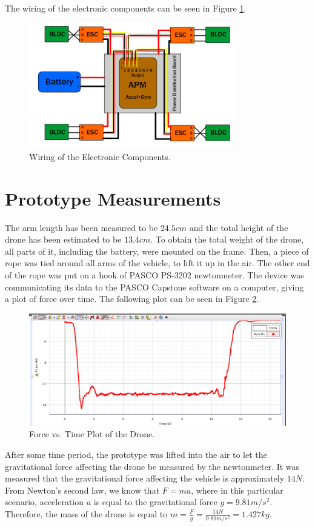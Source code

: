 The wiring of the electronic components can be seen in Figure \ref{wiring}.
\begin{figure}[H]
  \centering
    \includegraphics[width=0.8\textwidth]{images/Wiring2.png}
	\caption{Wiring of the Electronic Components.}
	\label{wiring}
\end{figure}

\section{Prototype Measurements}
The arm length has been measured to be $24.5 cm$ and the total height of the drone has been estimated to be $13.4 cm$.
To obtain the total weight of the drone, all parts of it, including the battery, were mounted on the frame. Then, a piece of rope was tied around all arms of the vehicle, to lift it up in the air. The other end of the rope was put on a hook of PASCO PS-3202 newtonmeter. The device was communicating its data to the PASCO Capstone software on a computer, giving a plot of force over time. The following plot can be seen in Figure \ref{weightPlot}.

\begin{figure}[H]
  \centering
    \includegraphics[width=1\textwidth]{images/weightPlot.png}
	\caption{Force vs. Time Plot of the Drone.}
	\label{weightPlot}
\end{figure}

After some time period, the prototype was lifted into the air to let the gravitational force affecting the drone be measured by the newtonmeter. It was measured that the gravitational force affecting the vehicle is approximately $14N$. From Newton's second law, we know that $F = ma$, where in this particular scenario, acceleration $a$ is equal to the gravitational force $g = 9.81m/s^2$. Therefore, the mass of the drone is equal to $m = \frac{F}{g} = \frac{14N}{9.81m/s^2} = 1.427kg$.